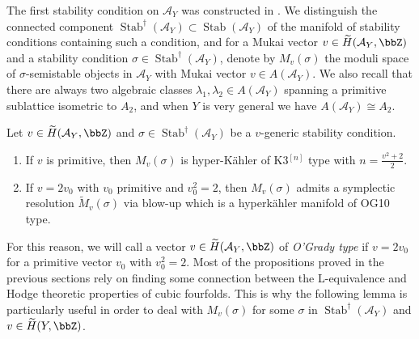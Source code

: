 \documentclass{amsart}
\DeclareMathOperator{\Stab}{Stab}
\begin{document}
The first stability condition on \(\mathcal{A}_Y\) was constructed in \cite{BLMS}. We distinguish the connected component $\Stab^{\dagger}(\mathcal{A}_Y)\subset\Stab(\mathcal{A}_Y)$ of the manifold of stability conditions containing such a condition, and for 
a Mukai vector $v\in \widetilde{H}(\mathcal{A}_Y, \bbZ)$ and a stability condition $\sigma\in\Stab^{\dagger}(\mathcal{A}_Y)$, denote by $M_v(\sigma)$ the moduli space of $\sigma$-semistable objects in $\mathcal{A}_Y$ with Mukai vector $v\in A(\mathcal{A}_Y)$. We also recall that there are always two algebraic classes \(\lambda_1,\lambda_2\in A(\mathcal{A}_Y)\) spanning a primitive sublattice isometric to \(A_2\), and when \(Y\) is very general we have \(A(\mathcal{A}_Y)\cong A_2\).
\begin{proposition}
    Let \(v\in \widetilde{H}(\mathcal{A}_Y, \bbZ)\) and \(\sigma \in \Stab^\dagger(\mathcal{A}_Y)\) be a $v$-generic stability condition.

    \begin{enumerate}
    \item If \(v\) is primitive, then \(M_v(\sigma)\) is hyper-Kähler of K3\(^{[n]}\) type with \(n=\frac{v^2+2}{2}\).
    \item If \(v=2v_0\) with \(v_0\) primitive and \(v_0^2=2\), then $M_v(\sigma)$ admits a symplectic resolution $\widetilde{M}_v(\sigma)$ via blow-up which is a hyperkähler manifold of OG10 type.
\end{enumerate}
\end{proposition}

    For this reason, we will call a vector $v\in \widetilde{H}(\mathcal{A}_Y, \bbZ)$ of \emph{O'Grady type} if $v=2v_0$ for a primitive vector $v_0$ with $v_0^2=2$.\newline\newline
    Most of the propositions proved in the previous sections rely on finding some connection between the L-equivalence and Hodge theoretic properties of cubic fourfolds. This is why the following lemma is particularly useful in order to deal with $M_v(\sigma)$ for some $\sigma$ in $\Stab^{\dagger}(\mathcal{A}_Y)$ and $v\in\widetilde{H}(Y,\bbZ)$.
\end{document}
